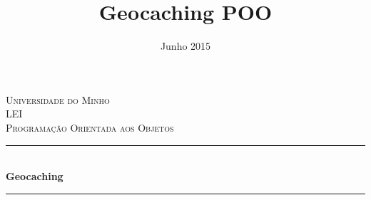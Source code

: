 \documentclass{article}
\title{Geocaching POO}
\date{Junho 2015}
\begin{document}
  \begin{titlepage}

\newcommand{\HRule}{\rule{\linewidth}{0.5mm}} %

\center %

\textsc{\LARGE Universidade do Minho}\\[1.5cm] %
\textsc{\Large LEI}\\[0.5cm] %
\textsc{\large Programação Orientada aos Objetos}\\[0.5cm] %

\HRule \\[0.4cm]
{ \huge \bfseries Geocaching}\\[0.4cm] %
\HRule \\[1.5cm]


\end{titlepage}
\end{document}
